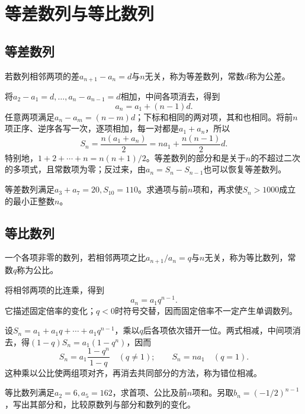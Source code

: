 \newpage
\section{等差数列与等比数列}
\label{sec:analysis-arithmetic-geometric}

\subsection{等差数列}

\begin{definition}
若数列相邻两项的差\(a_{n+1}-a_n=d\)与\(n\)无关，称为{\heiti{}等差数列}，常数\(d\)称为公差。
\end{definition}

将\(a_2-a_1=d,\ldots,a_n-a_{n-1}=d\)相加，中间各项消去，得到
\begin{equation}\label{eq:analysis-arithmetic-term}
 a_n=a_1+(n-1)d.
\end{equation}
任意两项满足\(a_n-a_m=(n-m)d\)；下标和相同的两对项，其和也相同。将前\(n\)项正序、逆序各写一次，逐项相加，每一对都是\(a_1+a_n\)，所以
\begin{equation}\label{eq:analysis-arithmetic-sum}
 S_n=\frac{n(a_1+a_n)}2=na_1+\frac{n(n-1)}2d.
\end{equation}
特别地，\(1+2+\cdots+n=n(n+1)/2\)。等差数列的部分和是关于\(n\)的不超过二次的多项式，且常数项为零；反过来，由\(a_n=S_n-S_{n-1}\)也可以恢复等差数列。

\begin{example}
等差数列满足\(a_3+a_7=20,S_{10}=110\)。求通项与前\(n\)项和，再求使\(S_n>1000\)成立的最小正整数\(n\)。
\end{example}

\subsection{等比数列}

\begin{definition}
一个各项非零的数列，若相邻两项之比\(a_{n+1}/a_n=q\)与\(n\)无关，称为{\heiti{}等比数列}，常数\(q\)称为公比。
\end{definition}

将相邻两项的比连乘，得到
\begin{equation}\label{eq:analysis-geometric-term}
 a_n=a_1q^{n-1}.
\end{equation}
它描述固定倍率的变化；\(q<0\)时符号交替，因而固定倍率不一定产生单调数列。

设\(S_n=a_1+a_1q+\cdots+a_1q^{n-1}\)，乘以\(q\)后各项依次错开一位。两式相减，中间项消去，得\((1-q)S_n=a_1(1-q^n)\)，因而
\begin{equation}\label{eq:analysis-geometric-sum}
 S_n=a_1\frac{1-q^n}{1-q}\quad(q\ne1);
 \qquad S_n=na_1\quad(q=1).
\end{equation}
这种乘以公比使两组项对齐，再消去共同部分的方法，称为{\heiti{}错位相减}。

\begin{example}
等比数列满足\(a_2=6,a_5=162\)，求首项、公比及前\(n\)项和。另取\(b_n=(-1/2)^{n-1}\)，写出其部分和，比较原数列与部分和数列的变化。
\end{example}
